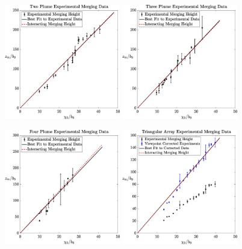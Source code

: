 \documentclass{jfm}
\begin{document}
	\begin{figure}
			\includegraphics[width=0.45\textwidth]{twoPlumeDataWithErrorBars.eps}\hfill
			\includegraphics[width=0.45\textwidth]{threePlumeDataWithErrorBars.eps}
		
			\includegraphics[width=0.45\textwidth]{fourPlumeDataWithErrorBars.eps}\hfill
			\includegraphics[width=0.45\textwidth]{triangularDataWithViewCorrectionAndErrorBars.eps}
		

\end{figure}
\end{document}
